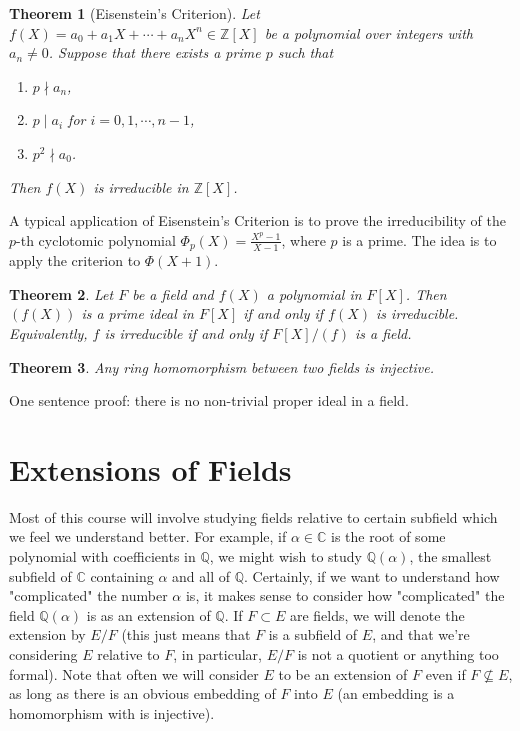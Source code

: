 \documentclass[12pt]{report}
\newtheorem{theorem}{Theorem}[section]
\theoremstyle{definition}
\newcommand{\ZZ}{\mathbb{Z}}
\newcommand{\CC}{\mathbb{C}}
\newcommand{\QQ}{\mathbb{Q}}
\begin{document}
\begin{theorem}[Eisenstein's Criterion]
	Let $f(X) = a_0+a_1X+\cdots+a_nX^n\in \ZZ[X]$ be a polynomial over integers with $a_n\not= 0$. Suppose that there exists a prime $p$ such that \begin{enumerate}
		\item  $p\nmid a_n$,
		\item  $p\mid a_i$  for  $i=0,1,\cdots,n-1$,
		\item  $p^2\nmid a_0$.
	\end{enumerate}
	Then $f(X)$ is irreducible in $\ZZ[X]$.
\end{theorem}

A typical application of Eisenstein's Criterion is to prove the irreducibility of the $p$-th cyclotomic polynomial $\Phi_p(X) = \frac{X^p-1}{X-1}$, where $p$ is a prime. The idea is to apply the criterion to $\Phi(X+1)$.

\begin{theorem}
	Let $F$ be a field and $f(X)$ a polynomial in $F[X]$. Then $(f(X))$ is a prime ideal in $F[X]$ if and only if $f(X)$ is irreducible. Equivalently, $f$ is irreducible if and only if $F[X]/(f)$ is a field.
\end{theorem}

\begin{theorem}
	Any ring homomorphism between two fields is injective.
\end{theorem}

\noindent One sentence proof: there is no non-trivial proper ideal in a field.

\section{Extensions of Fields}

Most of this course will involve studying fields relative to certain subfield which we feel we understand better. For example, if $\alpha\in\CC$ is the root of some polynomial with coefficients in $\QQ$, we might wish to study $\QQ(\alpha)$, the smallest subfield of $\CC$ containing $\alpha$ and all of $\QQ$. Certainly, if we want to understand how "complicated" the number $\alpha$ is, it makes sense to consider how "complicated" the field $\QQ(\alpha)$ is as an extension of $\QQ$. If $F \subset E$ are fields, we will denote the extension by $E/F$ (this just means that $F$ is a subfield of $E$, and that we're considering $E$ relative to $F$, in particular, $E/F$ is not a quotient or anything too formal). Note that often we will consider $E$ to be an extension of $F$ even if $F\nsubseteq E$, as long as there is an obvious embedding of $F$ into $E$ (an embedding is a homomorphism with is injective).
\end{document}
